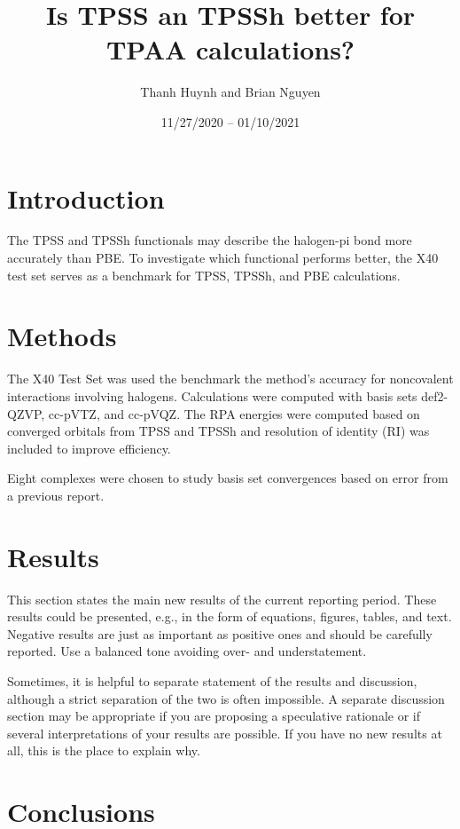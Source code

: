 \documentclass[11pt]{article}
\title{\textbf{Is TPSS an TPSSh better for TPAA calculations?}}
\author{Thanh Huynh and Brian Nguyen}
\date{11/27/2020 -- 01/10/2021 }
\begin{document}
\maketitle

\section{Introduction}

The TPSS and TPSSh functionals may describe the halogen-pi bond more
accurately than PBE. To investigate which functional performs better,
the X40 test set serves as a benchmark for TPSS, TPSSh, and PBE 
calculations.  


\section{Methods}

The X40 Test Set was used the benchmark the method's accuracy for 
noncovalent interactions involving halogens. Calculations were computed
with basis sets def2-QZVP, cc-pVTZ, and cc-pVQZ. The RPA energies were
computed based on converged orbitals from TPSS and TPSSh and resolution of identity (RI) was included to improve efficiency. 

Eight complexes were chosen to study basis set convergences based on
error from a previous report.   

\section{Results}

This section states the main new results of the current
reporting period. These results could be presented, e.g., in the form of
equations, figures, tables, and text. Negative results are just as
important as positive ones and should be carefully reported. Use a
balanced tone avoiding over- and understatement. 

Sometimes, it is helpful to separate statement of the results and
discussion, although a strict separation of the two is often
impossible. A separate discussion section may be appropriate if you are
proposing a speculative rationale or if several interpretations of your
results are possible. If you have no new results at all, this is the
place to explain why. 

\section{Conclusions}
\end{document}
